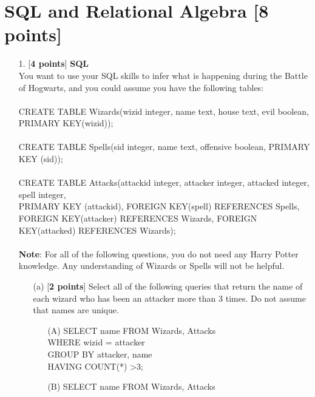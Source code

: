\documentclass[10pt]{article}
\begin{document}
\section{SQL and Relational Algebra \textbf{[8 points]}}
\begin{enumerate}
    \item[1.] [\textbf{4 points}] \textbf{SQL} \\
        You want to use your SQL skills to infer what is happening during the Battle of Hogwarts, and you could assume you have the following tables:
        \\
        \\
        CREATE TABLE Wizards(wizid integer, name text, house text, evil boolean, PRIMARY KEY(wizid));
        \\
        \\
        CREATE TABLE Spells(sid integer, name text, offensive boolean, PRIMARY KEY (sid));
        \\
        \\
        CREATE TABLE Attacks(attackid integer, attacker integer, attacked integer, spell integer,\\
        PRIMARY KEY (attackid), FOREIGN KEY(spell) REFERENCES Spells,\\
        FOREIGN KEY(attacker) REFERENCES Wizards, FOREIGN KEY(attacked) REFERENCES Wizards);
        \\
        \\
        \textbf{Note}: For all of the following questions, you do not need any Harry Potter knowledge. Any understanding of Wizards or Spells will not be helpful.
        \begin{enumerate}
            \item[(a)] [\textbf{2 points}] Select all of the following queries that return the name of each wizard who has been an
                attacker more than 3 times. Do not assume that names are unique.\\
                \begin{enumerate}
                    \item[(A)] SELECT name FROM Wizards, Attacks\\
                        WHERE wizid = attacker\\
                        GROUP BY attacker, name\\
                        HAVING COUNT(*) \textgreater  3;\\
                    \item[(B)] SELECT name FROM Wizards, Attacks\\

\end{enumerate}
\end{enumerate}
\end{enumerate}
\end{document}
